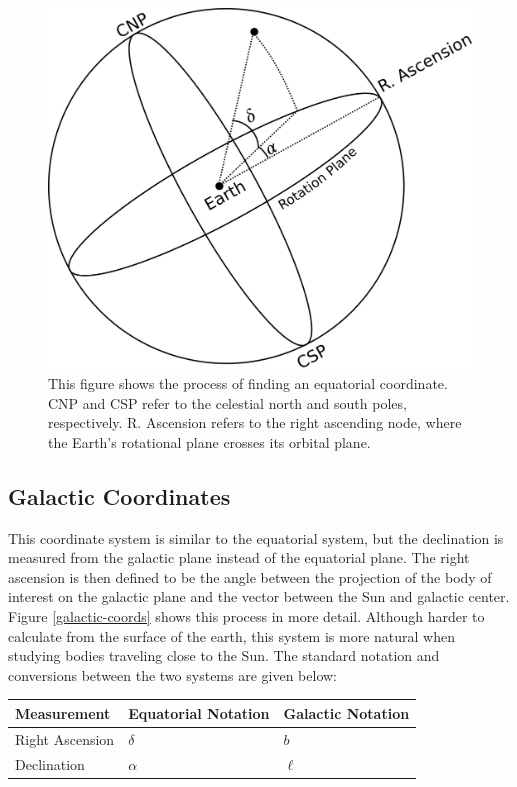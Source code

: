 \documentclass[12pt,twoside]{reedthesis}
\begin{document}
\begin{figure}[p]
    \includegraphics{imgs/equat.png}
    \caption{This figure shows the process of finding an equatorial coordinate. CNP and CSP refer to the celestial north and south poles, respectively. R. Ascension refers to the right ascending node, where the Earth's rotational plane crosses its orbital plane.}
    \label{equatorial-coords}
\end{figure}

\subsection*{Galactic Coordinates}

This coordinate system is similar to the equatorial system, but the declination is measured from the galactic plane instead of the equatorial plane. The right ascension is then defined to be the angle between the projection of the body of interest on the galactic plane and the vector between the Sun and galactic center. Figure \ref{galactic-coords} shows this process in more detail. Although harder to calculate from the surface of the earth, this system is more natural when studying bodies traveling close to the Sun. The standard notation and conversions between the two systems are given below:

\begin{tabular}{lll} \toprule
    Measurement & Equatorial Notation & Galactic Notation \\ \midrule
    Right Ascension &  $\delta$       & $b$               \\
    Declination     &  $\alpha$       & $\ell$            \\ \bottomrule
\end{tabular}
\end{document}
